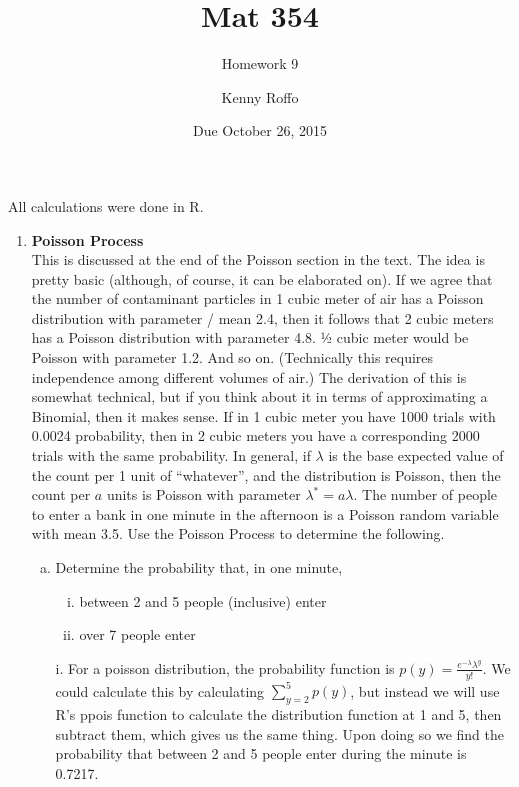 \documentclass{scrartcl}
\title{Mat 354}
\subtitle{Homework 9}
\author{Kenny Roffo}
\date{Due October 26, 2015}
\begin{document}
\maketitle

All calculations were done in R.

\begin{enumerate}

\item \textbf{Poisson Process}\\

This is discussed at the end of the Poisson section in the text. The idea is pretty basic (although, of course, it can be elaborated on). If we agree that the number of contaminant particles in 1 cubic meter of air has a Poisson distribution with parameter / mean 2.4, then it follows that 2 cubic meters has a Poisson distribution with parameter 4.8. 1⁄2 cubic meter would be Poisson with parameter 1.2. And so on. (Technically this requires independence among different volumes of air.) The derivation of this is somewhat technical, but if you think about it in terms of approximating a Binomial, then it makes sense. If in 1 cubic meter you have 1000 trials with 0.0024 probability, then in 2 cubic meters you have a corresponding 2000 trials with the same probability. In general, if $\lambda$ is the base expected value of the count per 1 unit of “whatever”, and the distribution is Poisson, then the count per $a$ units is Poisson with parameter $\lambda^* = a\lambda$. The number of people to enter a bank in one minute in the afternoon is a Poisson random variable with mean 3.5. Use the Poisson Process to determine the following.\\

\begin{enumerate}[a)]
\item Determine the probability that, in one minute,
  \begin{enumerate}[i.]
    \item between 2 and 5 people (inclusive) enter
    \item over 7 people enter
  \end{enumerate}

  i. For a poisson distribution, the probability function is $p(y) = \frac{e^{-\lambda}\lambda^y}{y!}$. We could calculate this by calculating $\sum_{y=2}^{5}p(y)$, but instead we will use R's ppois function to calculate the distribution function at 1 and 5, then subtract them, which gives us the same thing. Upon doing so we find the probability that between 2 and 5 people enter during the minute is 0.7217.\\
  

\end{enumerate}
\end{enumerate}
\end{document}
